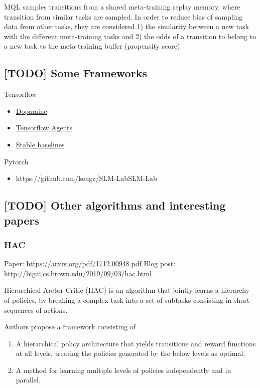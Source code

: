 \documentclass[12pt, english]{article}
\begin{document}
MQL samples transitions from a shared meta-training replay memory, where transition from similar tasks are sampled. In order to reduce bias of sampling data from other tasks, they are considered 1) the similarity between a new task with the different meta-training tasks and 2) the odds of a transition to belong to a new task vs the meta-training buffer (propensity score).



\subsection{[TODO] Some Frameworks}

Tensorflow

\begin{itemize}
  \item \href{}{Dopamine}
  \item \href{}{Tensorflow Agents}
  \item \href{https://stable-baselines.readthedocs.io/en/master/}{Stable baselines}
\end{itemize}

Pytorch

\begin{itemize}
  \item {https://github.com/kengz/SLM-Lab}{SLM-Lab}
\end{itemize}


\subsection{[TODO] Other algorithms and interesting papers}

\subsubsection{HAC}

Paper: \url{https://arxiv.org/pdf/1712.00948.pdf}
Blog post: \url{http://bigai.cs.brown.edu/2019/09/03/hac.html}

Hierarchical Arctor Critic (HAC) \cite{levy_learning_2019} is an algorithm that jointly learns a hierarchy of policies, by breaking a complex task into a set of subtasks consisting in short sequences of actions.

Authors propose a framework consisting of

\begin{enumerate}
  \item A hierarchical policy architecture that yields transitions and reward functions at all levels, treating the policies generated by the below levels as optimal.
  \item A method for learning multiple levels of policies independently and in parallel.
\end{enumerate}
\end{document}
